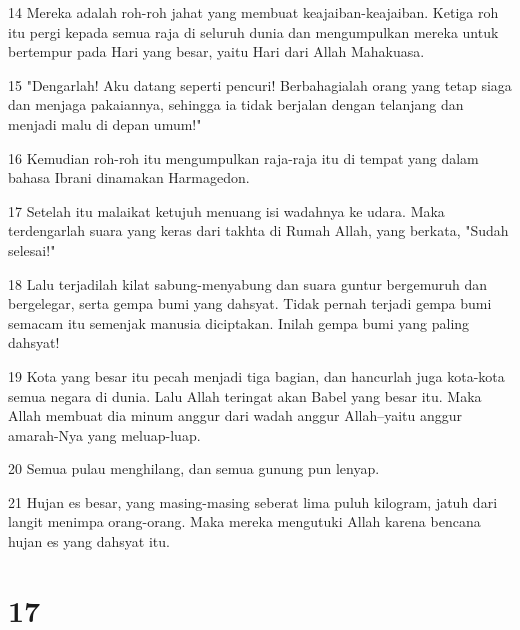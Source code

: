 \par 14 Mereka adalah roh-roh jahat yang membuat keajaiban-keajaiban. Ketiga roh itu pergi kepada semua raja di seluruh dunia dan mengumpulkan mereka untuk bertempur pada Hari yang besar, yaitu Hari dari Allah Mahakuasa.
\par 15 "Dengarlah! Aku datang seperti pencuri! Berbahagialah orang yang tetap siaga dan menjaga pakaiannya, sehingga ia tidak berjalan dengan telanjang dan menjadi malu di depan umum!"
\par 16 Kemudian roh-roh itu mengumpulkan raja-raja itu di tempat yang dalam bahasa Ibrani dinamakan Harmagedon.
\par 17 Setelah itu malaikat ketujuh menuang isi wadahnya ke udara. Maka terdengarlah suara yang keras dari takhta di Rumah Allah, yang berkata, "Sudah selesai!"
\par 18 Lalu terjadilah kilat sabung-menyabung dan suara guntur bergemuruh dan bergelegar, serta gempa bumi yang dahsyat. Tidak pernah terjadi gempa bumi semacam itu semenjak manusia diciptakan. Inilah gempa bumi yang paling dahsyat!
\par 19 Kota yang besar itu pecah menjadi tiga bagian, dan hancurlah juga kota-kota semua negara di dunia. Lalu Allah teringat akan Babel yang besar itu. Maka Allah membuat dia minum anggur dari wadah anggur Allah--yaitu anggur amarah-Nya yang meluap-luap.
\par 20 Semua pulau menghilang, dan semua gunung pun lenyap.
\par 21 Hujan es besar, yang masing-masing seberat lima puluh kilogram, jatuh dari langit menimpa orang-orang. Maka mereka mengutuki Allah karena bencana hujan es yang dahsyat itu.

\chapter{17}

